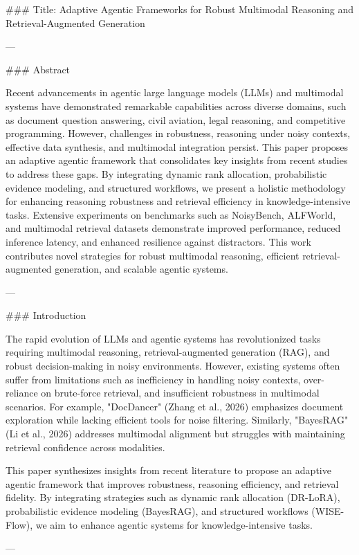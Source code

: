 ### Title: Adaptive Agentic Frameworks for Robust Multimodal Reasoning and Retrieval-Augmented Generation

---

### Abstract

Recent advancements in agentic large language models (LLMs) and multimodal systems have demonstrated remarkable capabilities across diverse domains, such as document question answering, civil aviation, legal reasoning, and competitive programming. However, challenges in robustness, reasoning under noisy contexts, effective data synthesis, and multimodal integration persist. This paper proposes an adaptive agentic framework that consolidates key insights from recent studies to address these gaps. By integrating dynamic rank allocation, probabilistic evidence modeling, and structured workflows, we present a holistic methodology for enhancing reasoning robustness and retrieval efficiency in knowledge-intensive tasks. Extensive experiments on benchmarks such as NoisyBench, ALFWorld, and multimodal retrieval datasets demonstrate improved performance, reduced inference latency, and enhanced resilience against distractors. This work contributes novel strategies for robust multimodal reasoning, efficient retrieval-augmented generation, and scalable agentic systems.

---

### Introduction

The rapid evolution of LLMs and agentic systems has revolutionized tasks requiring multimodal reasoning, retrieval-augmented generation (RAG), and robust decision-making in noisy environments. However, existing systems often suffer from limitations such as inefficiency in handling noisy contexts, over-reliance on brute-force retrieval, and insufficient robustness in multimodal scenarios. For example, "DocDancer" (Zhang et al., 2026) emphasizes document exploration while lacking efficient tools for noise filtering. Similarly, "BayesRAG" (Li et al., 2026) addresses multimodal alignment but struggles with maintaining retrieval confidence across modalities.

This paper synthesizes insights from recent literature to propose an adaptive agentic framework that improves robustness, reasoning efficiency, and retrieval fidelity. By integrating strategies such as dynamic rank allocation (DR-LoRA), probabilistic evidence modeling (BayesRAG), and structured workflows (WISE-Flow), we aim to enhance agentic systems for knowledge-intensive tasks.

---

